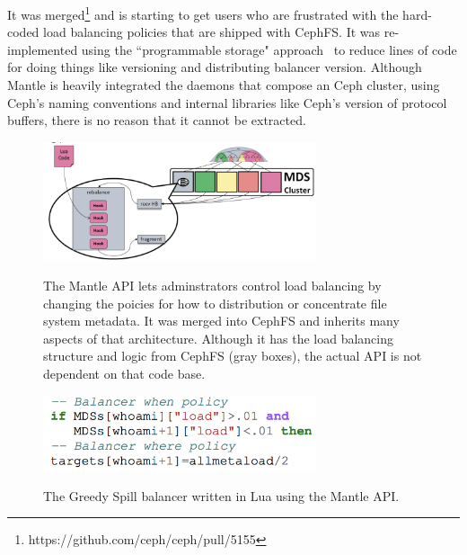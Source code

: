 It was merged\footnote{https://github.com/ceph/ceph/pull/5155} and is starting
to get users who are frustrated with the hard-coded load balancing policies
that are shipped with CephFS. It was re-implemented using the ``programmable
storage" approach~\cite{sevilla:eurosys17} to reduce lines of code for doing
things like versioning and distributing balancer version.  Although Mantle is
heavily integrated the daemons that compose an Ceph cluster, using Ceph's
naming conventions and internal libraries like Ceph's version of protocol
buffers, there is no reason that it cannot be extracted.

\begin{figure}[tb]
  \noindent\includegraphics[width=19pc,angle=0]{figures/arch-mantle.png}\\
  \caption{The Mantle API lets adminstrators control load balancing by
  changing the poicies for how to distribution or concentrate file system
  metadata. It was merged into CephFS and inherits many aspects of that
  architecture. Although it has the load balancing structure and logic from
  CephFS (gray boxes), the actual API is not dependent on that code base.}
  \label{fig:arch-mantle}
\end{figure}
\begin{figure}[tb]
  \noindent\includegraphics[width=19pc,angle=0]{figures/arch-mantle-example.png}\\
  \caption{The Greedy Spill balancer written in Lua using the Mantle API.}
  \label{fig:arch-mantle-example}
\end{figure}

